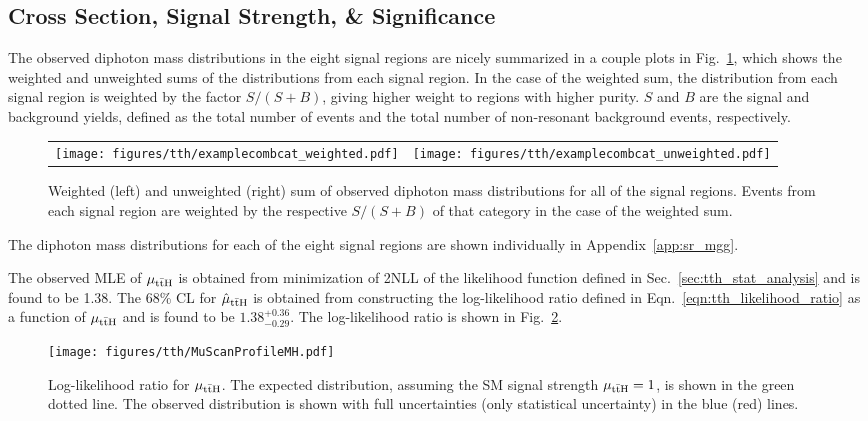 \subsection{Cross Section, Signal Strength, \& Significance}
The observed diphoton mass distributions in the eight signal regions are nicely summarized in a couple plots in Fig.~\ref{fig:tth_obs_sr_weighted}, which shows the weighted and unweighted sums of the distributions from each signal region.
In the case of the weighted sum, the distribution from each signal region is weighted by the factor $S / (S + B)$, giving higher weight to regions with higher purity.
$S$ and $B$ are the signal and background yields, defined as the total number of \Hgg events and the total number of non-resonant background events, respectively.
\begin{figure} [htbp!]
    \centering
    \begin{tabular} {c c}
        \texttt{[image: figures/tth/examplecombcat\_weighted.pdf]} &
        \texttt{[image: figures/tth/examplecombcat\_unweighted.pdf]}
    \end{tabular}
    \caption{Weighted (left) and unweighted (right) sum of observed diphoton mass distributions for all of the signal regions. Events from each signal region are weighted by the respective $S / (S +B)$ of that category in the case of the weighted sum.}
    \label{fig:tth_obs_sr_weighted}
\end{figure}

The diphoton mass distributions for each of the eight signal regions are shown individually in Appendix~\ref{app:sr_mgg}.

The observed MLE of $\mu_{\mathrm{t\bar{t}H}}$ is obtained from minimization of 2NLL of the likelihood function defined in Sec.~\ref{sec:tth_stat_analysis} and is found to be 1.38.
The 68\% CL for $\hat{\mu}_{\mathrm{t\bar{t}H}}$ is obtained from constructing the log-likelihood ratio defined in Eqn.~\ref{eqn:tth_likelihood_ratio} as a function of $\mu_{\mathrm{t\bar{t}H}}$ and is found to be $1.38^{+0.36}_{-0.29}$.
The log-likelihood ratio is shown in Fig.~\ref{fig:tth_llr}.

\begin{figure} [htbp!]
    \centering
    \texttt{[image: figures/tth/MuScanProfileMH.pdf]}
    \caption{Log-likelihood ratio for $\mu_{\mathrm{t\bar{t}H}}$. The expected distribution, assuming the SM signal strength $\mu_{\mathrm{t\bar{t}H}} = 1$, is shown in the green dotted line. The observed distribution is shown with full uncertainties (only statistical uncertainty) in the blue (red) lines.}
    \label{fig:tth_llr}
\end{figure}

